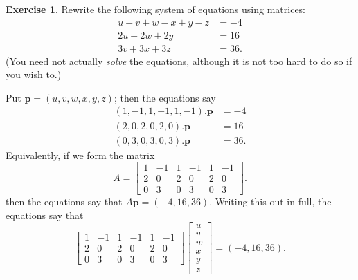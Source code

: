 \documentclass[a4paper]{book}
\newcommand{\RED}[1]{{\color{red}#1}}
\newcommand{\VEC}[1]    {\mathbf{#1}}
\renewcommand{\:}{\colon}
\newcommand{\EMPH}[1]{\RED{\emph{#1}}}
\theoremstyle{definition}
\newtheorem{exercise}[theorem]{Exercise}
\renewenvironment{solution}{\SolutionInline}{\endSolutionInline}
\begin{document}
\begin{exercise}
 Rewrite the following system of equations using matrices:
 \begin{align*}
  u-v+w-x+y-z &= -4 \\
  2u+2w+2y    &= 16 \\
  3v+3x+3z    &= 36.
 \end{align*}
 (You need not actually \EMPH{solve} the equations, although it is not
 too hard to do so if you wish to.)
\end{exercise}
\begin{solution}
 Put $\VEC{p}=(u,v,w,x,y,z)$; then the equations say
 \begin{align*}
  ( 1,-1, 1,-1, 1,-1).\VEC{p} &= -4 \\
  ( 2, 0, 2, 0, 2, 0).\VEC{p} &= 16 \\
  ( 0, 3, 0, 3, 0, 3).\VEC{p} &= 36.
 \end{align*}
 Equivalently, if we form the matrix
 \[ A = 
    \begin{bmatrix}
      1 & -1 &  1 & -1 &  1 & -1 \\
      2 &  0 &  2 &  0 &  2 &  0 \\
      0 &  3 &  0 &  3 &  0 &  3
    \end{bmatrix}.
 \]
 then the equations say that $A\VEC{p}=(-4,16,36)$.  Writing this out
 in full, the equations say that
 {\small \[ \begin{bmatrix}
      1 & -1 &  1 & -1 &  1 & -1 \\
      2 &  0 &  2 &  0 &  2 &  0 \\
      0 &  3 &  0 &  3 &  0 &  3
    \end{bmatrix}
    \begin{bmatrix}
      u \\ v \\ w \\ x \\ y \\ z
    \end{bmatrix} = 
    (-4,16,36).
 \]}
\end{solution}
\end{document}
